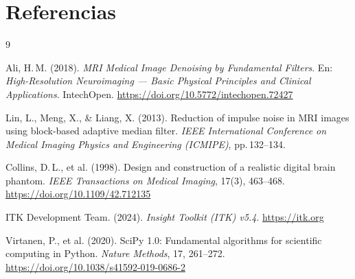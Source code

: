 \documentclass[12pt, a4paper]{article}
\begin{document}
\section*{Referencias}

\begin{thebibliography}{9}

  Ali, H.\,M. (2018).
  \textit{MRI Medical Image Denoising by Fundamental Filters}.
  En: \textit{High-Resolution Neuroimaging — Basic Physical Principles and
  Clinical Applications}. IntechOpen.
  \url{https://doi.org/10.5772/intechopen.72427}

  Lin, L., Meng, X., \& Liang, X. (2013).
  Reduction of impulse noise in MRI images using block-based adaptive median filter.
  \textit{IEEE International Conference on Medical Imaging Physics and Engineering
  (ICMIPE)}, pp.\,132--134.

  Collins, D.\,L., et al. (1998).
  Design and construction of a realistic digital brain phantom.
  \textit{IEEE Transactions on Medical Imaging}, 17(3), 463--468.
  \url{https://doi.org/10.1109/42.712135}

  ITK Development Team. (2024).
  \textit{Insight Toolkit (ITK) v5.4}.
  \url{https://itk.org}

  Virtanen, P., et al. (2020).
  SciPy 1.0: Fundamental algorithms for scientific computing in Python.
  \textit{Nature Methods}, 17, 261--272.
  \url{https://doi.org/10.1038/s41592-019-0686-2}

\end{thebibliography}
\end{document}
